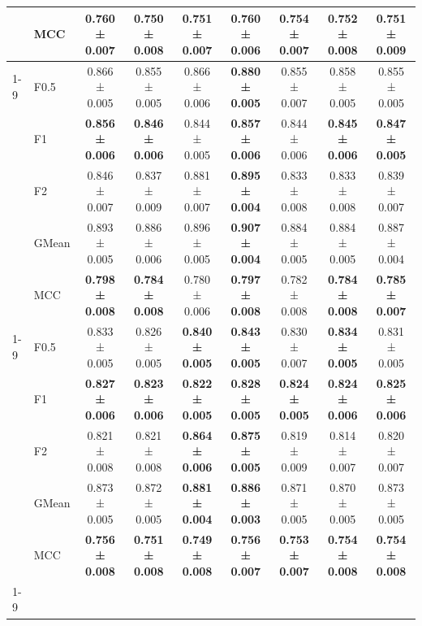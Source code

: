 \begin{table}[H]
{\begin{tabular}{llccccccc}
 & MCC & \textbf{0.760 ± 0.007} & \textbf{0.750 ± 0.008} & \textbf{0.751 ± 0.007} & \textbf{0.760 ± 0.006} & \textbf{0.754 ± 0.007} & \textbf{0.752 ± 0.008} & \textbf{0.751 ± 0.009} \\
\cline{1-9}
\multirow[t]{5}{*}{TabPFN} & F0.5 & 0.866 ± 0.005 & 0.855 ± 0.005 & 0.866 ± 0.006 & \textbf{0.880 ± 0.005} & 0.855 ± 0.007 & 0.858 ± 0.005 & 0.855 ± 0.005 \\
 & F1 & \textbf{0.856 ± 0.006} & \textbf{0.846 ± 0.006} & 0.844 ± 0.005 & \textbf{0.857 ± 0.006} & 0.844 ± 0.006 & \textbf{0.845 ± 0.006} & \textbf{0.847 ± 0.005} \\
 & F2 & 0.846 ± 0.007 & 0.837 ± 0.009 & 0.881 ± 0.007 & \textbf{0.895 ± 0.004} & 0.833 ± 0.008 & 0.833 ± 0.008 & 0.839 ± 0.007 \\
 & GMean & 0.893 ± 0.005 & 0.886 ± 0.006 & 0.896 ± 0.005 & \textbf{0.907 ± 0.004} & 0.884 ± 0.005 & 0.884 ± 0.005 & 0.887 ± 0.004 \\
 & MCC & \textbf{0.798 ± 0.008} & \textbf{0.784 ± 0.008} & 0.780 ± 0.006 & \textbf{0.797 ± 0.008} & 0.782 ± 0.008 & \textbf{0.784 ± 0.008} & \textbf{0.785 ± 0.007} \\
\cline{1-9}
\multirow[t]{5}{*}{XGBoost} & F0.5 & 0.833 ± 0.005 & 0.826 ± 0.005 & \textbf{0.840 ± 0.005} & \textbf{0.843 ± 0.005} & 0.830 ± 0.007 & \textbf{0.834 ± 0.005} & 0.831 ± 0.005 \\
 & F1 & \textbf{0.827 ± 0.006} & \textbf{0.823 ± 0.006} & \textbf{0.822 ± 0.005} & \textbf{0.828 ± 0.005} & \textbf{0.824 ± 0.005} & \textbf{0.824 ± 0.006} & \textbf{0.825 ± 0.006} \\
 & F2 & 0.821 ± 0.008 & 0.821 ± 0.008 & \textbf{0.864 ± 0.006} & \textbf{0.875 ± 0.005} & 0.819 ± 0.009 & 0.814 ± 0.007 & 0.820 ± 0.007 \\
 & GMean & 0.873 ± 0.005 & 0.872 ± 0.005 & \textbf{0.881 ± 0.004} & \textbf{0.886 ± 0.003} & 0.871 ± 0.005 & 0.870 ± 0.005 & 0.873 ± 0.005 \\
 & MCC & \textbf{0.756 ± 0.008} & \textbf{0.751 ± 0.008} & \textbf{0.749 ± 0.008} & \textbf{0.756 ± 0.007} & \textbf{0.753 ± 0.007} & \textbf{0.754 ± 0.008} & \textbf{0.754 ± 0.008} \\
\cline{1-9}
\bottomrule
\end{tabular}
    }
\end{table}
